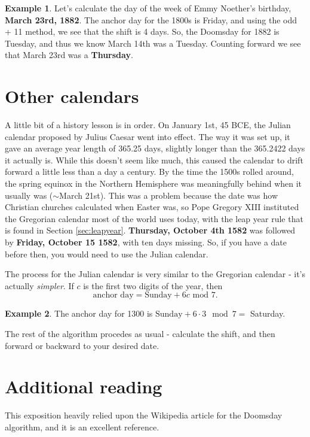 \documentclass[12pt,letterpaper]{article}
\theoremstyle{plain}
\theoremstyle{definition}
\newtheorem{example}{Example}
\begin{document}
\begin{example}
	Let's calculate the day of the week of Emmy Noether's birthday, \textbf{March 23rd, 1882}. The anchor day for the 1800s is Friday, and using the odd + 11 method, we see that the shift is 4 days. So, the Doomsday for 1882 is Tuesday, and thus we know March 14th was a Tuesday. Counting forward we see that March 23rd was a \textbf{Thursday}.
\end{example}

\section{Other calendars}\label{sec:non-gregorian}

A little bit of a history lesson is in order. On January 1st, 45 BCE, the Julian calendar proposed by Julius Caesar went into effect. The way it was set up, it gave an average year length of 365.25 days, slightly longer than the 365.2422 days it actually is. While this doesn't seem like much, this caused the calendar to drift forward a little less than a day a century. By the time the 1500s rolled around, the spring equinox in the Northern Hemisphere was meaningfully behind when it usually was (\(\sim\)March 21st). This was a problem because the date was how Christian churches calculated when Easter was, so Pope Gregory XIII instituted the Gregorian calendar most of the world uses today, with the leap year rule that is found in Section \ref{sec:leapyear}. \textbf{Thursday, October 4th 1582} was followed by \textbf{Friday, October 15 1582}, with ten days missing. So, if you have a date before then, you would need to use the Julian calendar. 

The process for the Julian calendar is very similar to the Gregorian calendar - it's actually \textit{simpler}. If \(c\) is the first two digits of the year, then 
\[\text{anchor day}=\text{Sunday}+6c\text{ mod } 7.\]
\begin{example}
	The anchor day for 1300 is \(\text{Sunday}+ 6\cdot 3\mod 7=\) Saturday. 
\end{example}
The rest of the algorithm procedes as usual - calculate the shift, and then forward or backward to your desired date. 

\section{Additional reading}
This exposition heavily relied upon the Wikipedia article for the Doomsday algorithm, and it is an excellent reference. 
\end{document}
